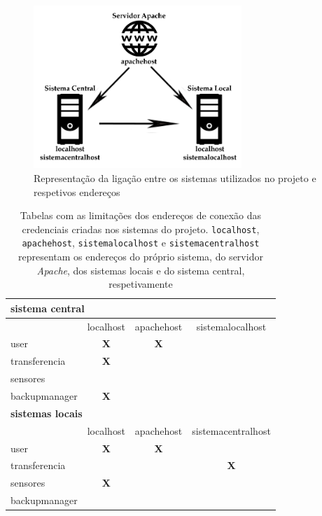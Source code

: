 \documentclass[11pt,twoside,a4paper]{report}
\begin{document}
\begin{figure}
	\begin{center}
		\includegraphics[width=0.7\textwidth]{ligacao_entre_sistemas} %
		\caption{Representação da ligação entre os sistemas utilizados no projeto e respetivos endereços}
		\label{fig:utilizadores2}
	\end{center}
\end{figure}
\begin{table}
	\centering
	\begin{tabular}{|l|c|c|c|}
		\multicolumn{4}{l}{\textbf{sistema central}} \\ \hline
		\makecell{} & localhost & apachehost & sistemalocalhost \\ \hline
		user & \textbf{X} & \textbf{X} & \\ \hline
		transferencia & \textbf{X} & & \\ \hline
		sensores & & & \\ \hline
		backupmanager & \textbf{X} & & \\ \hline
		\multicolumn{4}{l}{\textbf{sistemas locais}} \\ \hline
		\makecell{} & localhost & apachehost & sistemacentralhost \\ \hline
		user & \textbf{X} & \textbf{X} & \\ \hline
		transferencia & & & \textbf{X} \\ \hline
		sensores & \textbf{X} & & \\ \hline
		backupmanager & & & \\ \hline
	\end{tabular}
	\caption[Tabelas com as limitações dos endereços de conexão das credenciais criadas nos sistemas do projeto]{Tabelas com as limitações dos endereços de conexão das credenciais criadas nos sistemas do projeto. \texttt{localhost}, \texttt{apachehost}, \texttt{sistemalocalhost} e \texttt{sistemacentralhost} representam os endereços do próprio sistema, do servidor \textit{Apache}, dos sistemas locais e do sistema central, respetivamente}
	\label{tab:utilizadores3}
\end{table}
\end{document}
